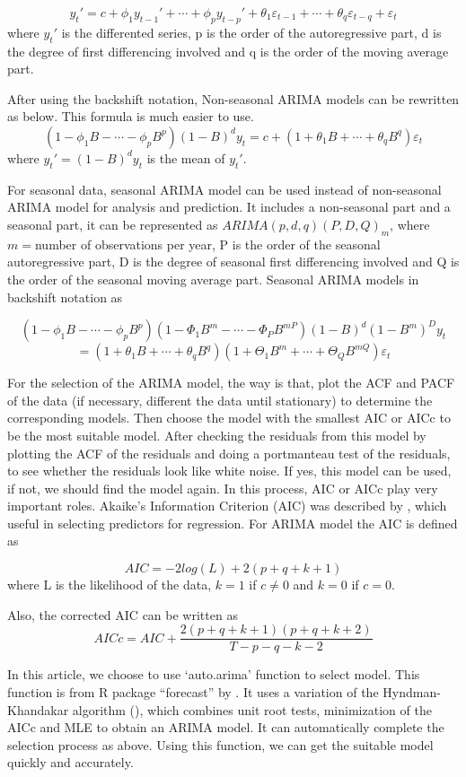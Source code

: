 \documentclass{monashthesis}
\theoremstyle{definition}
\theoremstyle{definition}
\theoremstyle{definition}
\theoremstyle{remark}
\begin{document}
\[y_t'=c+\phi_1y_{t-1}'+\cdots+\phi_py_{t-p}'+\theta_1\varepsilon_{t-1}+\cdots+\theta_q\varepsilon_{t-q}+\varepsilon_t\]
where \(y_t'\) is the differented series, p is the order of the
autoregressive part, d is the degree of first differencing involved and
q is the order of the moving average part.

After using the backshift notation, Non-seasonal ARIMA models can be
rewritten as below. This formula is much easier to use.
\[(1-\phi_1B-\cdots-\phi_pB^p)(1-B)^dy_t=c+(1+\theta_1B+\cdots+\theta_qB^q)\varepsilon_t\]
where \(y_t'=(1-B)^dy_t\) is the mean of \(y_t'\).

For seasonal data, seasonal ARIMA model can be used instead of
non-seasonal ARIMA model for analysis and prediction. It includes a
non-seasonal part and a seasonal part, it can be represented as
\(ARIMA(p,d,q)(P, D, Q)_m\), where \(m=\)number of observations per
year, P is the order of the seasonal autoregressive part, D is the
degree of seasonal first differencing involved and Q is the order of the
seasonal moving average part. Seasonal ARIMA models in backshift
notation as

\[(1-\phi_1B-\cdots-\phi_pB^p)(1-\Phi_{1}B^{m}-\cdots-\Phi_{P}B^{mP})(1-B)^d(1-B^{m})^Dy_{t}\]
\[=(1+\theta_1B+\cdots+\theta_qB^q)(1+\Theta_{1}B^{m}+\cdots+\Theta_{Q}B^{mQ})\varepsilon_{t}\]

For the selection of the ARIMA model, the way is that, plot the ACF and
PACF of the data (if necessary, different the data until stationary) to
determine the corresponding models. Then choose the model with the
smallest AIC or AICc to be the most suitable model. After checking the
residuals from this model by plotting the ACF of the residuals and doing
a portmanteau test of the residuals, to see whether the residuals look
like white noise. If yes, this model can be used, if not, we should find
the model again. In this process, AIC or AICc play very important roles.
Akaike's Information Criterion (AIC) was described by \textcite{A74},
which useful in selecting predictors for regression. For ARIMA model the
AIC is defined as

\[AIC=-2log(L)+2(p+q+k+1)\] where L is the likelihood of the data,
\(k=1\) if \(c\neq0\) and \(k=0\) if \(c=0\).

Also, the corrected AIC can be written as
\[AICc=AIC+\frac{2(p+q+k+1)(p+q+k+2)}{T-p-q-k-2}\]

In this article, we choose to use `auto.arima' function to select model.
This function is from R package ``forecast'' by \textcite{RH181}. It
uses a variation of the Hyndman-Khandakar algorithm (\textcite{RK08}),
which combines unit root tests, minimization of the AICc and MLE to
obtain an ARIMA model. It can automatically complete the selection
process as above. Using this function, we can get the suitable model
quickly and accurately.
\end{document}
